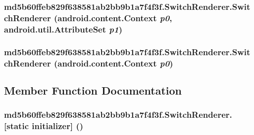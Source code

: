 \hypertarget{classmd5b60ffeb829f638581ab2bb9b1a7f4f3f_1_1_switch_renderer_6aa5634ceb38e4e6ba17fd3174fe2903}{
\subsubsection[{SwitchRenderer}]{\setlength{\rightskip}{0pt plus 5cm}md5b60ffeb829f638581ab2bb9b1a7f4f3f.SwitchRenderer.SwitchRenderer (android.content.Context {\em p0}, \/  android.util.AttributeSet {\em p1})}}
\label{classmd5b60ffeb829f638581ab2bb9b1a7f4f3f_1_1_switch_renderer_6aa5634ceb38e4e6ba17fd3174fe2903}


\hypertarget{classmd5b60ffeb829f638581ab2bb9b1a7f4f3f_1_1_switch_renderer_ecb9a4aa4555f192e24f464151495b5d}{
\subsubsection[{SwitchRenderer}]{\setlength{\rightskip}{0pt plus 5cm}md5b60ffeb829f638581ab2bb9b1a7f4f3f.SwitchRenderer.SwitchRenderer (android.content.Context {\em p0})}}
\label{classmd5b60ffeb829f638581ab2bb9b1a7f4f3f_1_1_switch_renderer_ecb9a4aa4555f192e24f464151495b5d}




\subsection{Member Function Documentation}
\hypertarget{classmd5b60ffeb829f638581ab2bb9b1a7f4f3f_1_1_switch_renderer_e710661b76463c9bcf3e5aa5ae37d860}{
\subsubsection[{[static initializer]}]{\setlength{\rightskip}{0pt plus 5cm}md5b60ffeb829f638581ab2bb9b1a7f4f3f.SwitchRenderer.\mbox{[}static initializer\mbox{]} ()}}
\label{classmd5b60ffeb829f638581ab2bb9b1a7f4f3f_1_1_switch_renderer_e710661b76463c9bcf3e5aa5ae37d860}




